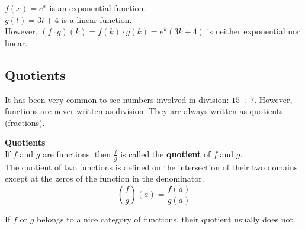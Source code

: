 \documentclass{ximera}
\begin{document}
\begin{example}

$f(x) = e^x$ is an exponential function. \\
$g(t) = 3 t + 4$ is a linear function. \\

However, $(f \cdot g)(k) = f(k) \cdot g(k) = e^k (3 k + 4)$ is neither exponential nor linear.

\end{example}























\subsection*{Quotients}



It has been very common to see numbers involved in division: $15 \div 7$. However, functions are never written as division. They are always written as quotients (fractions).




\begin{template}  \textbf{\textcolor{blue!55!black}{Quotients}} \\


If  $f$ and $g$ are functions, then $\frac{f}{g}$ is called the \textbf{\textcolor{green!50!black}{quotient}} of $f$ and $g$. \\

The quotient of two functions is defined on the intersection of their two domains except at the zeros of the function in the denominator. \\


\[ \left(\frac{f}{g}\right)(a) = \frac{f(a)}{g(a)}  \]



\end{template}



\begin{warning}

If $f$ or $g$ belongs to a nice category of functions, their quotient usually does not.

\end{warning}
\end{document}
